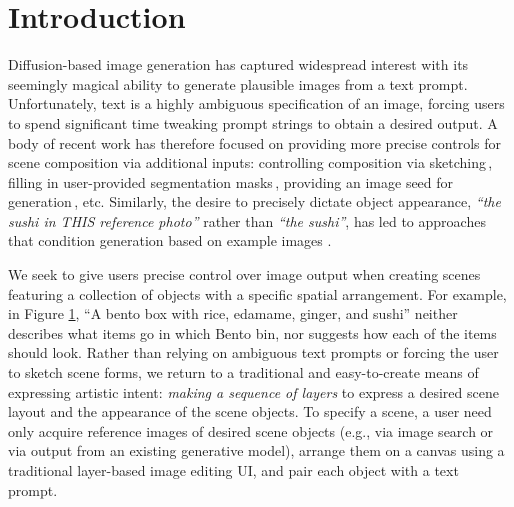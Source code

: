 \section{Introduction}
\label{sec:intro}
\vspace{-0.5em}

Diffusion-based image generation \cite{sohl2015deep,song2019generative,ho2020denoising, dhariwal2021diffusion, dalle2, latentDiffusion} has captured widespread interest with its seemingly magical ability to generate plausible images from a text prompt. Unfortunately, text is a highly ambiguous specification of an image, forcing users to spend significant time tweaking prompt strings to obtain a desired output. 
A body of recent work has therefore focused on providing more precise controls for scene composition via additional inputs: controlling composition via sketching\,\cite{ediffi}, filling in user-provided segmentation masks\,\cite{avrahami2022blended,objectstitch}, providing an image seed for generation\,\cite{sdedit}, etc. Similarly, the desire to precisely dictate object appearance, \emph{``the sushi in THIS reference photo''} rather than \emph{``the sushi''}, has led to approaches that condition generation based on example images \cite{TextualInversion,Dreambooth,CustomDiffusion}.

We seek to give users precise control over image output when creating scenes featuring a collection of objects with a specific spatial arrangement. For example, in Figure \hyperlink{fig:teaser}{1}, ``A bento box with rice, edamame, ginger, and sushi'' neither describes what items go in which Bento bin, nor suggests how each of the items should look. Rather than relying on ambiguous text prompts or forcing the user to sketch scene forms, we return to a traditional and easy-to-create means of expressing artistic intent: \emph{making a sequence of layers} to express a desired scene layout and the appearance of the scene objects. To specify a scene, a user need only acquire reference images of desired scene objects (e.g., via image search or via output from an existing generative model), arrange them on a canvas using a traditional layer-based image editing UI, and pair each object with a text prompt. 

